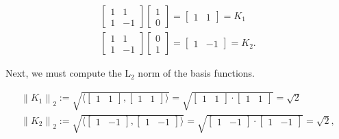 \begin{equation}
  \begin{array}{l}
    \begin{bmatrix}
      1 & 1 \\
      1 & -1
    \end{bmatrix}
    \begin{bmatrix}
      1 \\
      0
    \end{bmatrix}
    =
    \begin{bmatrix}
      1 & 1
    \end{bmatrix} = K_1
    \\
    \begin{bmatrix}
      1 & 1 \\
      1 & -1
    \end{bmatrix}
    \begin{bmatrix}
      0 \\
      1
    \end{bmatrix}
    =
    \begin{bmatrix}
      1 & -1
    \end{bmatrix} = K_2.
  \end{array}
\end{equation}

Next, we must compute the L$_2$ norm of the basis functions.

\begin{equation*}
  \begin{array}{l}
    \left\| K_1 \right\|_2 := \sqrt{\langle \begin{bmatrix}1 & 1\end{bmatrix}, \begin{bmatrix}1 & 1\end{bmatrix} \rangle} = \sqrt{\begin{bmatrix}1 & 1\end{bmatrix}\cdot \begin{bmatrix}1 & 1\end{bmatrix}} = \sqrt{2}\\
    \left\| K_2 \right\|_2 := \sqrt{\langle \begin{bmatrix}1 & -1\end{bmatrix}, \begin{bmatrix}1 & -1\end{bmatrix} \rangle} = \sqrt{\begin{bmatrix}1 & -1\end{bmatrix}\cdot \begin{bmatrix}1 & -1\end{bmatrix}} = \sqrt{2},
  \end{array}
\end{equation*}

